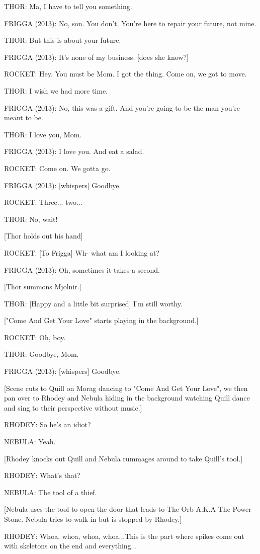 THOR: Ma, I have to tell you something.

FRIGGA (2013): No, son. You don't. You're here to repair your future, not mine.

THOR: But this is about your future.

FRIGGA (2013): It's none of my business. [does she know?]

ROCKET: Hey. You must be Mom. I got the thing. Come on, we got to move.

THOR: I wish we had more time.

FRIGGA (2013): No, this was a gift. And you're going to be the man you're meant to be.

THOR: I love you, Mom.

FRIGGA (2013): I love you. And eat a salad.

ROCKET: Come on. We gotta go.

FRIGGA (2013): [whispers] Goodbye.

ROCKET: Three... two...

THOR: No, wait!

[Thor holds out his hand]

ROCKET: [To Frigga] Wh- what am I looking at?

FRIGGA (2013): Oh, sometimes it takes a second.

[Thor summons Mjolnir.]

THOR: [Happy and a little bit surprised] I'm still worthy.

["Come And Get Your Love" starts playing in the background.]

ROCKET: Oh, boy.

THOR: Goodbye, Mom.

FRIGGA (2013): [whispers] Goodbye.

[Scene cuts to Quill on Morag dancing to "Come And Get Your Love", we then pan over to Rhodey and Nebula hiding in the background watching Quill dance and sing to their perspective without music.]

RHODEY: So he's an idiot?

NEBULA: Yeah.

[Rhodey knocks out Quill and Nebula rummages around to take Quill's tool.]

RHODEY: What's that?

NEBULA: The tool of a thief.

[Nebula uses the tool to open the door that leads to The Orb A.K.A The Power Stone. Nebula tries to walk in but is stopped by Rhodey.]

RHODEY: Whoa, whoa, whoa, whoa...This is the part where spikes come out with skeletons on the end and everything...

